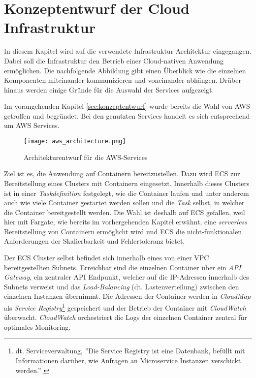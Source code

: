 \section{Konzeptentwurf der Cloud Infrastruktur}
\label{sec:cloud-infra}
In diesem Kapitel wird auf die verwendete Infrastruktur Architektur eingegangen. %
\mbox{Dabei} soll die Infrastruktur den Betrieb einer Cloud-nativen Anwendung ermöglichen. Die nachfolgende Abbildung gibt einen Überblick wie die einzelnen Komponenten miteinander kommunizieren und voneinander abhängen. Drüber hinaus werden einige Gründe für die Auswahl der Services aufgezeigt.

Im vorangehenden Kapitel \ref{sec:konzeptentwurf} wurde bereits die Wahl von \ac{AWS} getroffen und begründet. Bei den genutzten Services handelt es sich entsprechend um \ac{AWS} Services.

\begin{figure}[H]
    \centering
    \texttt{[image: aws\_architecture.png]}
    \caption{Architekturentwurf für die AWS-Services}
    \label{fig:CloudArchitektur}
\end{figure}

Ziel ist es, die Anwendung auf Containern bereitzustellen. Dazu wird \ac{ECS} zur Bereitstellung eines Clusters mit Containern eingesetzt. Innerhalb dieses Clusters ist in einer \textit{Taskdefinition} festgelegt, wie die Container laufen und unter anderem auch wie viele Container gestartet werden sollen und die \textit{Task} selbst, in welcher die Container bereitgestellt werden. Die Wahl ist deshalb auf \ac{ECS} gefallen, weil hier mit \gls{Fargate}, wie bereits im vorhergehenden Kapitel erwähnt, eine \textit{serverless} Bereitstellung von Containern ermöglicht wird und \ac{ECS} die nicht-funktionalen Anforderungen der Skalierbarkeit und Fehlertoleranz bietet. \pagebreak

Der \ac{ECS} Cluster selbst befindet sich innerhalb eines von einer \ac{VPC} bereitgestellten Subnets. Erreichbar sind die einzelnen Container über ein \textit{API Gateway}, ein zentraler API Endpunkt, welcher auf die IP-Adressen innerhalb des Subnets verweist und das \textit{Load-Balancing} (dt. Lastenverteilung) zwischen den einzelnen Instanzen übernimmt. Die Adressen der Container werden in \textit{CloudMap} als \textit{Service Registry}\footnote{dt. Serviceverwaltung, ''Die Service Registry ist eine Datenbank, befüllt mit Informationen darüber, wie Anfragen an Microservice Instanzen verschickt werden.'' \cite[Übersetzt aus dem Englischen][]{Peyrott2015}} gespeichert und der Betrieb der Container mit \textit{CloudWatch} überwacht. \textit{CloudWatch} orchestriert die Logs der einzelnen Container zentral für optimales Monitoring.

